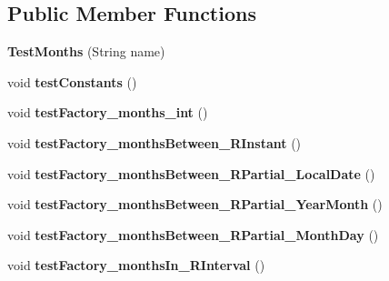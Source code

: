 \subsection*{Public Member Functions}
\begin{DoxyCompactItemize}
\item 
\hypertarget{classorg_1_1joda_1_1time_1_1_test_months_a69c7fe4aaba84b90c3f55ef95e5c10d9}{{\bfseries Test\-Months} (String name)}\label{classorg_1_1joda_1_1time_1_1_test_months_a69c7fe4aaba84b90c3f55ef95e5c10d9}

\item 
\hypertarget{classorg_1_1joda_1_1time_1_1_test_months_a158185a0f6aff9d747f4044aab903230}{void {\bfseries test\-Constants} ()}\label{classorg_1_1joda_1_1time_1_1_test_months_a158185a0f6aff9d747f4044aab903230}

\item 
\hypertarget{classorg_1_1joda_1_1time_1_1_test_months_a91328bcfbf98511656c7a680e21c008f}{void {\bfseries test\-Factory\-\_\-months\-\_\-int} ()}\label{classorg_1_1joda_1_1time_1_1_test_months_a91328bcfbf98511656c7a680e21c008f}

\item 
\hypertarget{classorg_1_1joda_1_1time_1_1_test_months_af55ec4353dea4350e753f8f396bda80b}{void {\bfseries test\-Factory\-\_\-months\-Between\-\_\-\-R\-Instant} ()}\label{classorg_1_1joda_1_1time_1_1_test_months_af55ec4353dea4350e753f8f396bda80b}

\item 
\hypertarget{classorg_1_1joda_1_1time_1_1_test_months_a85c1905d75ddf8dcfaa8c550eea425a2}{void {\bfseries test\-Factory\-\_\-months\-Between\-\_\-\-R\-Partial\-\_\-\-Local\-Date} ()}\label{classorg_1_1joda_1_1time_1_1_test_months_a85c1905d75ddf8dcfaa8c550eea425a2}

\item 
\hypertarget{classorg_1_1joda_1_1time_1_1_test_months_a77c15601ff6a337298c4fe69933efffe}{void {\bfseries test\-Factory\-\_\-months\-Between\-\_\-\-R\-Partial\-\_\-\-Year\-Month} ()}\label{classorg_1_1joda_1_1time_1_1_test_months_a77c15601ff6a337298c4fe69933efffe}

\item 
\hypertarget{classorg_1_1joda_1_1time_1_1_test_months_a80cfb723c5c9b5fbbe6d07db5ef3f7e4}{void {\bfseries test\-Factory\-\_\-months\-Between\-\_\-\-R\-Partial\-\_\-\-Month\-Day} ()}\label{classorg_1_1joda_1_1time_1_1_test_months_a80cfb723c5c9b5fbbe6d07db5ef3f7e4}

\item 
\hypertarget{classorg_1_1joda_1_1time_1_1_test_months_a72271ef25f2d7b622fedce3fec22462d}{void {\bfseries test\-Factory\-\_\-months\-In\-\_\-\-R\-Interval} ()}\label{classorg_1_1joda_1_1time_1_1_test_months_a72271ef25f2d7b622fedce3fec22462d}


\end{DoxyCompactItemize}
